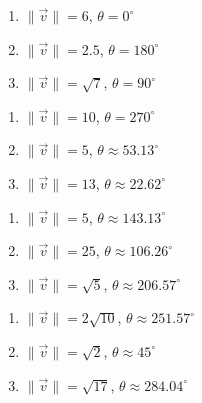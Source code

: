 \documentclass{ximera}
\begin{document}
 

 

\begin{enumerate}

\setcounter{enumi}{\value{HW}}

\item  $\|\overrightarrow{v}\| = 6$, $\theta = 0^{\circ}$
\item $\|\overrightarrow{v}\| = 2.5$, $\theta = 180^{\circ}$
\item  $\|\overrightarrow{v}\| = \sqrt{7}$, $\theta = 90^{\circ}$

\setcounter{HW}{\value{enumi}}

\end{enumerate}

 

 

\begin{enumerate}

\setcounter{enumi}{\value{HW}}

\item  $\|\overrightarrow{v}\| = 10$, $\theta = 270^{\circ}$
\item $\|\overrightarrow{v}\| = 5$, $\theta \approx 53.13^{\circ}$
\item $\|\overrightarrow{v}\| = 13$, $\theta \approx 22.62^{\circ}$

\setcounter{HW}{\value{enumi}}

\end{enumerate}

 

 

\begin{enumerate}

\setcounter{enumi}{\value{HW}}

\item $\|\overrightarrow{v}\| = 5$, $\theta \approx 143.13^{\circ}$
\item $\|\overrightarrow{v}\| = 25$, $\theta \approx 106.26^{\circ}$
\item $\|\overrightarrow{v}\| = \sqrt{5}$, $\theta \approx 206.57^{\circ}$

\setcounter{HW}{\value{enumi}}

\end{enumerate}

 

 

\begin{enumerate}

\setcounter{enumi}{\value{HW}}

\item  $\|\overrightarrow{v}\| = 2\sqrt{10}$, $\theta \approx 251.57^{\circ}$
\item  $\|\overrightarrow{v}\| = \sqrt{2}$, $\theta \approx 45^{\circ}$
\item $\|\overrightarrow{v}\| = \sqrt{17}$, $\theta \approx 284.04^{\circ}$

\setcounter{HW}{\value{enumi}}

\end{enumerate}
\end{document}

